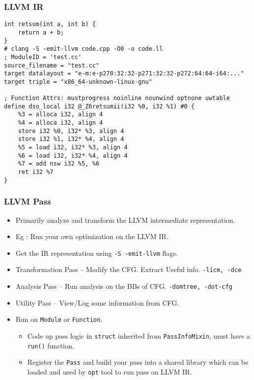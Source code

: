 \documentclass{beamer}
\begin{document}
\begin{frame}[fragile]
	\frametitle{LLVM IR}
	\begin{verbatim}
int retsum(int a, int b) {
	return a + b;
}
# clang -S -emit-llvm code.cpp -O0 -o code.ll
; ModuleID = 'test.cc'
source_filename = "test.cc"
target datalayout = "e-m:e-p270:32:32-p271:32:32-p272:64:64-i64:..."
target triple = "x86_64-unknown-linux-gnu"

; Function Attrs: mustprogress noinline nounwind optnone uwtable
define dso_local i32 @_Z6retsumii(i32 %0, i32 %1) #0 {
	%3 = alloca i32, align 4
	%4 = alloca i32, align 4
	store i32 %0, i32* %3, align 4
	store i32 %1, i32* %4, align 4
	%5 = load i32, i32* %3, align 4
	%6 = load i32, i32* %4, align 4
	%7 = add nsw i32 %5, %6
	ret i32 %7
}
	\end{verbatim}
\end{frame}

\begin{frame}
	\frametitle{LLVM Pass}
	\begin{itemize}
		\item Primarily analyze and transform the LLVM intermediate representation. \pause
		\item Eg : Run your own optimization on the LLVM IR. \pause
		\item Get the IR representation using \texttt{-S -emit-llvm} flags. \pause
		\item Transformation Pass -- Modify the CFG. Extract Useful info. \texttt{-licm, -dce}\pause
		\item Analysis Pass -- Run analysis on the BBs of CFG. \texttt{-domtree, -dot-cfg}\pause 
		\item Utility Pass -- View/Log some information from CFG. \pause
		\item Run on \texttt{Module} \pause or \texttt{Function}. \pause
		\begin{itemize}
			\item Code up pass logic in \texttt{struct} inherited from \texttt{PassInfoMixin}, \pause must have a \texttt{run()} function. \pause
			\item Register the \texttt{Pass} and build your pass into a shared library which can be loaded and used by \texttt{opt} tool to run pass on LLVM IR. 
		\end{itemize}
	\end{itemize}
\end{frame}
\end{document}
